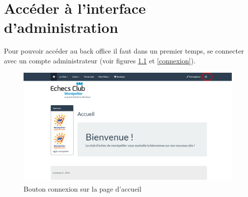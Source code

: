 \documentclass[a4paper,12pt, notitlepage]{report}
\begin{document}
\chapter{Accéder à l'interface d'administration}
Pour pouvoir accéder au back office il faut dans un premier temps, se connecter avec un compte administrateur (voir figures \ref{accueil-btn-connexion} et \ref{connexion}).
\begin{figure} 
    \caption{Bouton connexion sur la page d'accueil}  
    \label{accueil-btn-connexion}
    \centering
    \includegraphics[scale=0.3]{images/acceuil-btn-connexion.png}
\end{figure}
\end{document}
